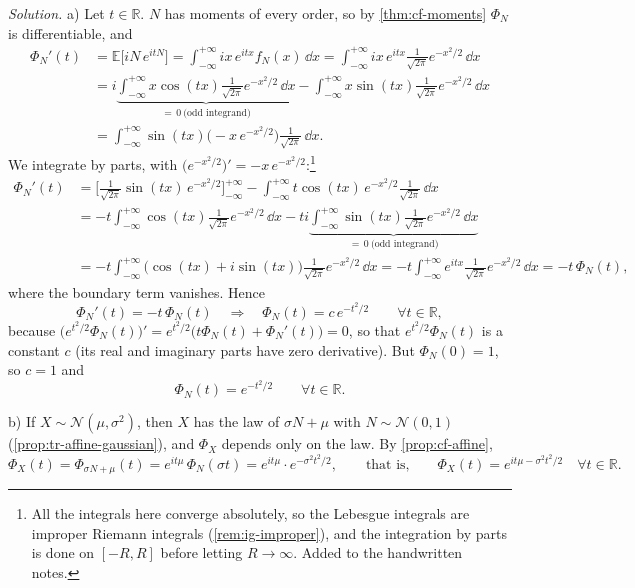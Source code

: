 \begin{example}
\emph{Solution.} a) Let $t\in\mathbb R$. $N$ has moments of every order, so by
\cref{thm:cf-moments} $\Phi_N$ is differentiable, and
\[
\begin{aligned}
  \Phi_N'(t)&=\mathbb E\big[iN\,e^{itN}\big]=\int_{-\infty}^{+\infty}ix\,e^{itx}f_N(x)\,\dd x
  =\int_{-\infty}^{+\infty}ix\,e^{itx}\frac1{\sqrt{2\pi}}e^{-x^2/2}\,\dd x\\
  &=i\underbrace{\int_{-\infty}^{+\infty}x\cos(tx)\frac1{\sqrt{2\pi}}e^{-x^2/2}\,\dd x}_{=\,0\ \text{(odd integrand)}}
   -\int_{-\infty}^{+\infty}x\sin(tx)\frac1{\sqrt{2\pi}}e^{-x^2/2}\,\dd x\\
  &=\int_{-\infty}^{+\infty}\sin(tx)\big(-x\,e^{-x^2/2}\big)\frac1{\sqrt{2\pi}}\,\dd x .
\end{aligned}
\]
We integrate by parts, with $\big(e^{-x^2/2}\big)'=-x\,e^{-x^2/2}$:\footnote{All the integrals
here converge absolutely, so the Lebesgue integrals are improper Riemann integrals
(\cref{rem:ig-improper}), and the integration by parts is done on $[-R,R]$ before letting
$R\to\infty$. Added to the handwritten notes.}
\[
\begin{aligned}
  \Phi_N'(t)&=\Big[\frac1{\sqrt{2\pi}}\sin(tx)\,e^{-x^2/2}\Big]_{-\infty}^{+\infty}
   -\int_{-\infty}^{+\infty}t\cos(tx)\,e^{-x^2/2}\frac1{\sqrt{2\pi}}\,\dd x\\
  &=-t\int_{-\infty}^{+\infty}\cos(tx)\frac1{\sqrt{2\pi}}e^{-x^2/2}\,\dd x
   -ti\underbrace{\int_{-\infty}^{+\infty}\sin(tx)\frac1{\sqrt{2\pi}}e^{-x^2/2}\,\dd x}_{=\,0\ \text{(odd integrand)}}\\
  &=-t\int_{-\infty}^{+\infty}\big(\cos(tx)+i\sin(tx)\big)\frac1{\sqrt{2\pi}}e^{-x^2/2}\,\dd x
  =-t\int_{-\infty}^{+\infty}e^{itx}\frac1{\sqrt{2\pi}}e^{-x^2/2}\,\dd x=-t\,\Phi_N(t),
\end{aligned}
\]
where the boundary term vanishes. Hence
\[
  \Phi_N'(t)=-t\,\Phi_N(t)\quad\Longrightarrow\quad\Phi_N(t)=c\,e^{-t^2/2}\qquad\forall t\in\mathbb R,
\]
because $\big(e^{t^2/2}\Phi_N(t)\big)'=e^{t^2/2}\big(t\Phi_N(t)+\Phi_N'(t)\big)=0$, so that
$e^{t^2/2}\Phi_N(t)$ is a constant $c$ (its real and imaginary parts have zero derivative). But
$\Phi_N(0)=1$, so $c=1$ and
\[
  \Phi_N(t)=e^{-t^2/2}\qquad\forall t\in\mathbb R .
\]

b) If $X\sim\mathcal N(\mu,\sigma^2)$, then $X$ has the law of $\sigma N+\mu$ with
$N\sim\mathcal N(0,1)$ (\cref{prop:tr-affine-gaussian}), and $\Phi_X$ depends only on the law. By
\cref{prop:cf-affine},
\[
  \Phi_X(t)=\Phi_{\sigma N+\mu}(t)=e^{it\mu}\,\Phi_N(\sigma t)=e^{it\mu}\cdot e^{-\sigma^2t^2/2},
  \qquad\text{that is,}\qquad\Phi_X(t)=e^{it\mu-\sigma^2t^2/2}\quad\forall t\in\mathbb R .
\]


\end{example}
